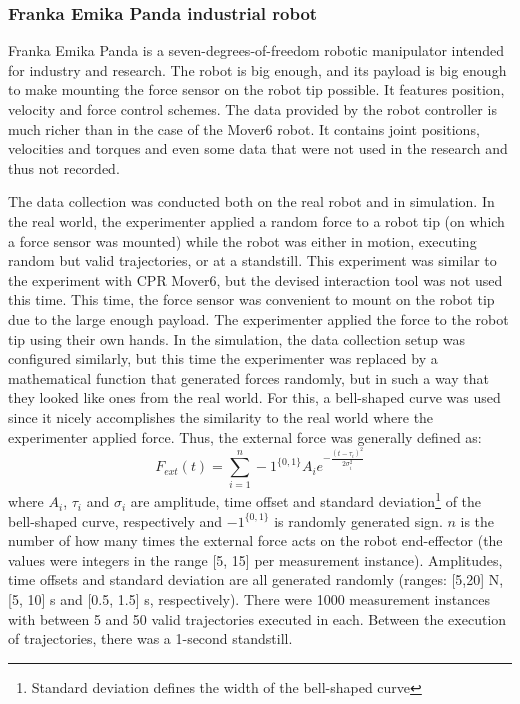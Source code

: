 \subsubsection{Franka Emika Panda industrial robot}

Franka Emika Panda is a seven-degrees-of-freedom robotic manipulator intended for industry and research. The robot is big enough, and its payload is big enough to make mounting the force sensor on the robot tip possible. It features position, velocity and force control schemes. The data provided by the robot controller is much richer than in the case of the Mover6 robot. It contains joint positions, velocities and torques and even some data that were not used in the research and thus not recorded.

The data collection was conducted both on the real robot and in simulation. In the real world, the experimenter applied a random force to a robot tip (on which a force sensor was mounted) while the robot was either in motion, executing random but valid trajectories, or at a standstill. This experiment was similar to the experiment with CPR Mover6, but the devised interaction tool was not used this time. This time, the force sensor was convenient to mount on the robot tip due to the large enough payload. The experimenter applied the force to the robot tip using their own hands. In the simulation, the data collection setup was configured similarly, but this time the experimenter was replaced by a mathematical function that generated forces randomly, but in such a way that they looked like ones from the real world. For this, a bell-shaped curve was used since it nicely accomplishes the similarity to the real world where the experimenter applied force. Thus, the external force was generally defined as:
\[
F_{ext}(t) = \sum^n_{i=1}-1^{\{0,1\}}A_i e^{-\frac{(t-\tau_i)^2}{2\sigma_i^2}}
\]
where $A_i$, $\tau_i$ and $\sigma_i$ are amplitude, time offset and standard deviation\footnote{Standard deviation defines the width of the bell-shaped curve} of the bell-shaped curve, respectively and $-1^{\{0,1\}}$ is randomly generated sign. $n$ is the number of how many times the external force acts on the robot end-effector (the values were integers in the range [5, 15] per measurement instance). Amplitudes, time offsets and standard deviation are all generated randomly (ranges: [5,20] N, [5, 10] s and [0.5, 1.5] s, respectively). There were 1000 measurement instances with between 5 and 50 valid trajectories executed in each. Between the execution of trajectories,  there was a 1-second standstill.

